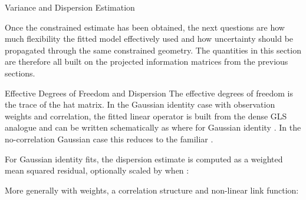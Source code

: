 \begin{Section}{Variance and Dispersion Estimation}


Once the constrained estimate has been obtained, the next questions are how
much flexibility the fitted model effectively used and how uncertainty should
be propagated through the same constrained geometry. The quantities in this
section are therefore all built on the projected information matrices from
the previous sections.

%
\begin{SubSection}{Effective Degrees of Freedom and Dispersion}
The effective degrees of freedom is the trace of the hat matrix. In the
Gaussian identity case with observation weights and correlation, the fitted
linear operator is built from the dense GLS analogue
 and can be written schematically as
where for Gaussian identity . In the
no-correlation Gaussian case this reduces to the familiar
.

For Gaussian identity fits, the dispersion estimate is computed as a
weighted mean squared residual, optionally scaled by
 when
:

More generally with weights, a correlation structure and non-linear link function:


\end{SubSection}
\end{Section}
